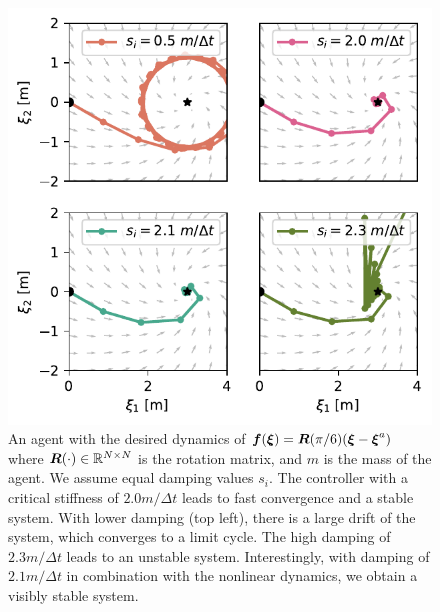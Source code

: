 \begin{figure}[htbp]
\centering
  \includegraphics[width=\columnwidth]{figures/discrete_controller_parameters_comparison_stable}
\caption{An agent with the desired dynamics of
$\boldsymbol{f}(\boldsymbol{\xi}) = \boldsymbol{R}(\pi / 6) (\boldsymbol{\xi}  - \boldsymbol{\xi}^a)$ where $\boldsymbol{R}(\cdot) \in \mathbb{R}^{N \times N}$ is the rotation matrix, and $m$ is the mass of the agent. We assume equal damping values $s_i$.
The controller with a critical stiffness of $2.0 m / \Delta t$ leads to fast convergence and a stable system. With lower damping (top left), there is a large drift of the system, which converges to a limit cycle. 
The high damping of $2.3 m / \Delta t$ leads to an unstable system. 
Interestingly, with damping of $2.1 m / \Delta t$ in combination with the nonlinear dynamics, we obtain a visibly stable system.}
  \label{fig:discrete_controller_parameters_comparison_stable}
\end{figure}


